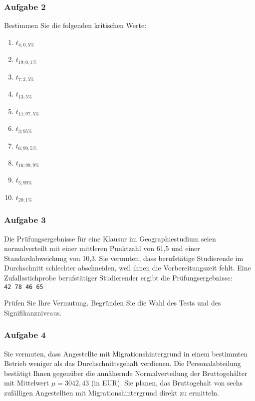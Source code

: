 \documentclass[
  ngerman,
]{article}
\providecommand{\tightlist}{%
  \setlength{\itemsep}{0pt}\setlength{\parskip}{0pt}}
\begin{document}
\hypertarget{aufgabe-2-4}{%
\subsubsection{Aufgabe 2}\label{aufgabe-2-4}}

Bestimmen Sie die folgenden kritischen Werte:

\begin{enumerate}
\def\labelenumi{\alph{enumi})}
\tightlist
\item
  \(t_{4;0,5\%}\)
\item
  \(t_{19;0,1\%}\)
\item
  \(t_{7;2,5\%}\)
\item
  \(t_{13;5\%}\)
\item
  \(t_{11;97,5\%}\)
\item
  \(t_{3;95\%}\)
\item
  \(t_{6;99,5\%}\)
\item
  \(t_{16;99,9\%}\)
\item
  \(t_{5;99\%}\)
\item
  \(t_{20;1\%}\)
\end{enumerate}

\hypertarget{aufgabe-3-2}{%
\subsubsection{Aufgabe 3}\label{aufgabe-3-2}}

Die Prüfungsergebnisse für eine Klausur im Geographiestudium seien normalverteilt mit einer mittleren Punktzahl von 61,5 und einer Standardabweichung von 10,3. Sie vermuten, dass berufstätige Studierende im Durchschnitt schlechter abschneiden, weil ihnen die Vorbereitungszeit fehlt. Eine Zufallsstichprobe berufstätiger Studierender ergibt die Prüfungsergebnisse: \texttt{42\ 78\ 46\ 65}

Prüfen Sie Ihre Vermutung. Begründen Sie die Wahl des Tests und des Signifikanzniveaus.

\hypertarget{aufgabe-4-1}{%
\subsubsection{Aufgabe 4}\label{aufgabe-4-1}}

Sie vermuten, dass Angestellte mit Migrationshintergrund in einem bestimmten Betrieb weniger als das Durchschnittsgehalt verdienen. Die Personalabteilung bestätigt Ihnen gegenüber die annähernde Normalverteilung der Bruttogehälter mit Mittelwert \(\mu=3042,43\) (in EUR). Sie planen, das Bruttogehalt von sechs zufälligen Angestellten mit Migrationshintergrund direkt zu ermitteln.\nopagebreak 
\end{document}
